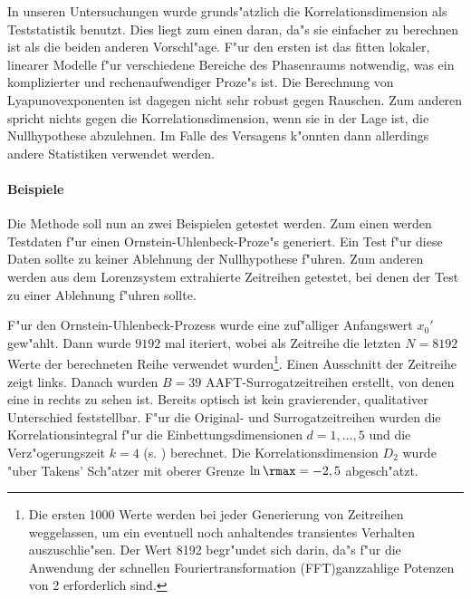 In unseren Untersuchungen wurde grunds"atzlich die Korrelationsdimension als Teststatistik 
benutzt. Dies liegt zum einen daran, da"s sie einfacher zu berechnen ist als die beiden
anderen Vorschl"age. F"ur den ersten ist das fitten lokaler, linearer Modelle f"ur
verschiedene Bereiche des Phasenraums notwendig, was ein komplizierter und
rechenaufwendiger Proze"s ist. Die Berechnung von Lyapunovexponenten ist dagegen nicht
sehr robust gegen Rauschen. Zum anderen spricht nichts gegen die Korrelationsdimension,
wenn sie in der Lage ist, die Nullhypothese abzulehnen. Im Falle des Versagens k"onnten
dann allerdings andere Statistiken verwendet werden. 

\paragraph{Beispiele}
Die Methode soll nun an zwei Beispielen getestet werden. Zum einen werden Testdaten
f"ur einen Ornstein-Uhlenbeck-Proze"s generiert. Ein Test f"ur diese Daten sollte zu
keiner Ablehnung der Nullhypothese f"uhren. Zum anderen werden aus dem Lorenzsystem
extrahierte Zeitreihen getestet, bei denen der Test zu einer Ablehnung f"uhren sollte.

F"ur den Ornstein-Uhlenbeck-Prozess wurde eine zuf"alliger Anfangswert $x_0'$
gew"ahlt. Dann wurde  $9192$ mal iteriert, wobei als Zeitreihe die
letzten $N=8192$ Werte der berechneten Reihe verwendet wurden\footnote{Die ersten 1000
  Werte werden bei jeder Generierung von Zeitreihen weggelassen, um ein eventuell noch
  anhaltendes transientes Verhalten auszuschlie"sen. Der Wert 8192 begr"undet sich darin,
  da"s f"ur die Anwendung der schnellen Fouriertransformation (FFT)ganzzahlige  Potenzen
  von 2 erforderlich sind. }. Einen Ausschnitt der Zeitreihe zeigt 
links. Danach wurden $B=39$ AAFT-Surrogatzeitreihen erstellt, von denen eine in
 rechts zu sehen ist. Bereits optisch ist kein gravierender,
qualitativer Unterschied feststellbar. F"ur die Original- und Surrogatzeitreihen wurden
die Korrelationsintegral f"ur die Einbettungsdimensionen $d=1,\dots,5$ und die Verz"ogerungszeit
$k=4$ (s. ) berechnet. Die Korrelationsdimension
$D_2$ wurde "uber Takens' Sch"atzer mit oberer Grenze $\ln\rmax=-2,5$ abgesch"atzt.

